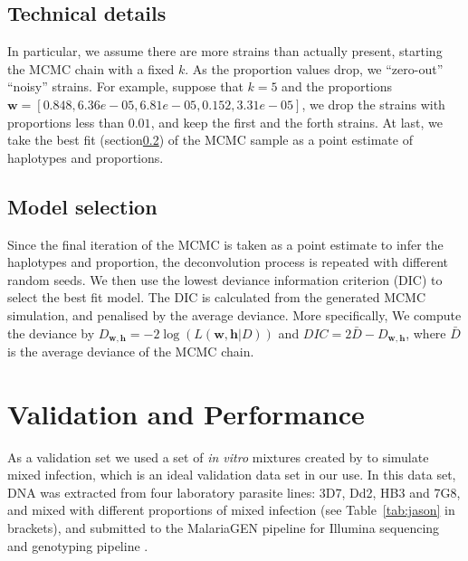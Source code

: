 \documentclass{bioinfo}
\begin{document}
\subsection{Technical details}
In particular, we assume there are more strains than actually present, starting the MCMC chain with a fixed $k$. As the proportion values drop, we ``zero-out'' ``noisy'' strains. For example, suppose that $k=5$ and the proportions $\mathbf w= [0.848, 6.36e-05, 6.81e-05, 0.152, 3.31e-05]$, we drop the strains with proportions less than $0.01$, and keep the first and the forth strains. At last, we take the best fit (section\ref{sec:method.dic}) of the MCMC sample as a point estimate of haplotypes and proportions.



\subsection{Model selection}\label{sec:method.dic}
Since the final iteration of the MCMC is taken as a point estimate to infer the haplotypes and proportion, the deconvolution process is repeated with different random seeds. We then use the lowest deviance information criterion (DIC) to select the best fit model. The DIC is calculated from the generated MCMC simulation, and penalised by the average deviance. More specifically, We compute the deviance by $ D_{\mathbf{w}, \mathbf{h}} = -2 \log( L (\mathbf{w}, \mathbf{h}|D) )$ and $DIC = 2\bar{D} - D_{\mathbf{w}, \mathbf{h}}$, where $\bar{D}$ is the average deviance of the MCMC chain.



\section{Validation and Performance}
As a validation set we used a set of {\it in vitro} mixtures created by \citet{Wendler2015} to simulate mixed infection, which is an ideal validation data set in our use. In this data set, DNA was extracted from four laboratory parasite lines: 3D7, Dd2, HB3 and 7G8, and mixed with different proportions of mixed infection (see Table~\ref{tab:jason} in brackets), and submitted to the MalariaGEN pipeline \citep{MalariaGen2008} for Illumina sequencing and genotyping pipeline \citep{Menske2012}.
\end{document}
